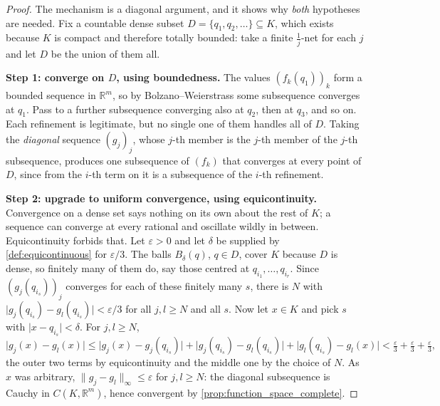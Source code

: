 \begin{proof}
The mechanism is a diagonal argument, and it shows why \emph{both} hypotheses are needed. Fix a
countable dense subset $D = \{q_1,q_2,\dots\} \subseteq K$, which exists because $K$ is compact
and therefore totally bounded: take a finite $\tfrac1j$-net for each $j$ and let $D$ be the union
of them all.

\textbf{Step 1: converge on $D$, using boundedness.} The values $(f_k(q_1))_k$ form a bounded
sequence in $\mathbb{R}^m$, so by Bolzano--Weierstrass some subsequence converges at $q_1$. Pass
to a further subsequence converging also at $q_2$, then at $q_3$, and so on. Each refinement is
legitimate, but no single one of them handles all of $D$. Taking the \emph{diagonal} sequence
$(g_j)_j$, whose $j$-th member is the $j$-th member of the $j$-th subsequence, produces one
subsequence of $(f_k)$ that converges at every point of $D$, since from the $i$-th term on it is
a subsequence of the $i$-th refinement.

\textbf{Step 2: upgrade to uniform convergence, using equicontinuity.} Convergence on a dense
set says nothing on its own about the rest of $K$; a sequence can converge at every rational and
oscillate wildly in between. Equicontinuity forbids that. Let $\varepsilon > 0$ and let $\delta$
be supplied by \cref{def:equicontinuous} for $\varepsilon/3$. The balls $B_\delta(q)$, $q \in D$,
cover $K$ because $D$ is dense, so finitely many of them do, say those centred at
$q_{i_1},\dots,q_{i_r}$. Since $(g_j(q_{i_s}))_j$ converges for each of these finitely many $s$,
there is $N$ with $\lvert g_j(q_{i_s}) - g_l(q_{i_s})\rvert < \varepsilon/3$ for all
$j,l \geq N$ and all $s$. Now let $x \in K$ and pick $s$ with $\lvert x - q_{i_s}\rvert < \delta$.
For $j,l \geq N$,
\[\lvert g_j(x) - g_l(x)\rvert \leq \lvert g_j(x) - g_j(q_{i_s})\rvert
  + \lvert g_j(q_{i_s}) - g_l(q_{i_s})\rvert + \lvert g_l(q_{i_s}) - g_l(x)\rvert
  < \tfrac{\varepsilon}{3} + \tfrac{\varepsilon}{3} + \tfrac{\varepsilon}{3},\]
the outer two terms by equicontinuity and the middle one by the choice of $N$. As $x$ was
arbitrary, $\lVert g_j - g_l\rVert_\infty \leq \varepsilon$ for $j,l \geq N$: the diagonal
subsequence is Cauchy in $C(K,\mathbb{R}^m)$, hence convergent by
\cref{prop:function_space_complete}.
\end{proof}

